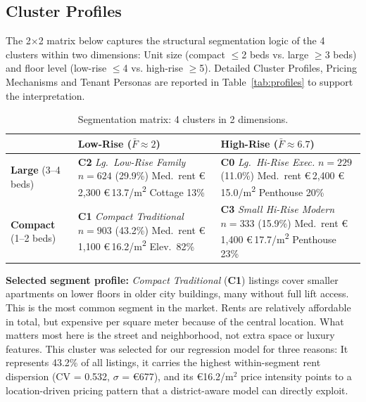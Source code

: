 \documentclass[10pt,a4paper,twocolumn]{article}
\newcommand{\cluster}[1]{\textbf{C#1}}
\newcommand{\eur}[1]{€\,#1}
\newcommand{\sqm}{m\textsuperscript{2}}
\newcommand{\seg}[1]{\textit{#1}}          %
\begin{document}
\subsection{Cluster Profiles}

The 2$\times$2 matrix below captures the structural segmentation logic of the 4 clusters within two dimensions: Unit size (compact $\leq$2 beds vs. large $\geq$3 beds) and floor level (low-rise $\leq$4 vs. high-rise $\geq$5). Detailed Cluster Profiles, Pricing Mechanisms and Tenant Personas are reported in Table~\ref{tab:profiles} to support the interpretation.

\begin{table}[H]
\centering
\caption{Segmentation matrix: 4 clusters in 2 dimensions.}
\label{tab:matrix}
\small
\setlength{\tabcolsep}{3pt}
\begin{tabular}{@{}p{1.4cm}|p{3.0cm}|p{3.0cm}@{}}
\toprule
 & \textbf{Low-Rise ($\bar{F}\!\approx\!2$)} & \textbf{High-Rise ($\bar{F}\!\approx\!6.7$)} \\
\midrule
\textbf{Large} \newline (3--4 beds) &
  \cluster{2} \textit{Lg.\ Low-Rise Family} \newline
  $n\!=\!624$ (29.9\%) \newline
  Med.\ rent \eur{2,300} \newline
  \eur{13.7}/\sqm{} \textbar{} Cottage 13\% &
  \cluster{0} \textit{Lg.\ Hi-Rise Exec.} \newline
  $n\!=\!229$ (11.0\%) \newline
  Med.\ rent \eur{2,400} \newline
  \eur{15.0}/\sqm{} \textbar{} Penthouse 20\% \\
\midrule
\textbf{Compact} \newline (1--2 beds) &
  \cluster{1} \textit{Compact Traditional} \newline
  $n\!=\!903$ (43.2\%) \newline
  Med.\ rent \eur{1,100} \newline
  \eur{16.2}/\sqm{} \textbar{} Elev.\ 82\% &
  \cluster{3} \textit{Small Hi-Rise Modern} \newline
  $n\!=\!333$ (15.9\%) \newline
  Med.\ rent \eur{1,400} \newline
  \eur{17.7}/\sqm{} \textbar{} Penthouse 23\% \\
\bottomrule
\end{tabular}
\end{table}
\textbf{Selected segment profile:} \seg{Compact Traditional} (\cluster{1}) listings cover smaller apartments on lower floors in older city buildings, many without full lift access. This is the most common segment in the market. Rents are relatively affordable in total, but expensive per square meter because of the central location. What matters most here is the street and neighborhood, not extra space or luxury features. This cluster was selected for our regression model for three reasons: It represents 43.2\% of all listings, it carries the highest within-segment rent dispersion (CV = 0.532, $\sigma$ = €677), and its €16.2/m$^{2}$ price intensity points to a location-driven pricing pattern that a district-aware model can directly exploit.
\end{document}
